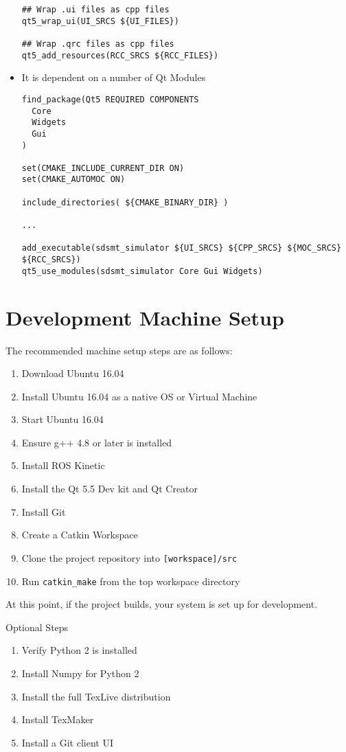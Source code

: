 \begin{itemize}
\begin{lstlisting}
## Wrap .ui files as cpp files
qt5_wrap_ui(UI_SRCS ${UI_FILES})

## Wrap .qrc files as cpp files
qt5_add_resources(RCC_SRCS ${RCC_FILES})
	\end{lstlisting}
	\item It is dependent on a number of Qt Modules
	\begin{lstlisting}
find_package(Qt5 REQUIRED COMPONENTS
  Core
  Widgets
  Gui
)

set(CMAKE_INCLUDE_CURRENT_DIR ON)
set(CMAKE_AUTOMOC ON)

include_directories( ${CMAKE_BINARY_DIR} )

...

add_executable(sdsmt_simulator ${UI_SRCS} ${CPP_SRCS} ${MOC_SRCS} ${RCC_SRCS})
qt5_use_modules(sdsmt_simulator Core Gui Widgets)
	\end{lstlisting}
\end{itemize}

\section{Development Machine Setup}
The recommended machine setup steps are as follows:
\begin{enumerate}
	\item Download Ubuntu 16.04
	\item Install Ubuntu 16.04 as a native OS or Virtual Machine
	\item Start Ubuntu 16.04
	\item Ensure g++ 4.8 or later is installed
	\item Install ROS Kinetic
	\item Install the Qt 5.5 Dev kit and Qt Creator
	\item Install Git
	\item Create a Catkin Workspace
	\item Clone the project repository into \lstinline|[workspace]/src|
	\item Run \lstinline|catkin_make| from the top workspace directory
\end{enumerate}
At this point, if the project builds, your system is set up for development.

Optional Steps
\begin{enumerate}
	\item Verify Python 2 is installed
	\item Install Numpy for Python 2
	\item Install the full TexLive distribution
	\item Install TexMaker
	\item Install a Git client UI
\end{enumerate}
